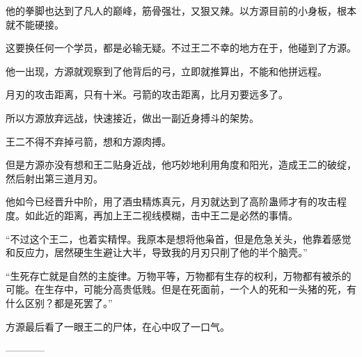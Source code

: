 \begin{this_body}
他的拳脚也达到了凡人的巅峰，筋骨强壮，又狠又辣。以方源目前的小身板，根本就不能硬接。

这要换任何一个学员，都是必输无疑。不过王二不幸的地方在于，他碰到了方源。

他一出现，方源就观察到了他背后的弓，立即就推算出，不能和他拼远程。

月刃的攻击距离，只有十米。弓箭的攻击距离，比月刃要远多了。

所以方源放弃远战，快速接近，做出一副近身搏斗的架势。

王二不得不弃掉弓箭，想和方源肉搏。

但是方源亦没有想和王二贴身近战，他巧妙地利用角度和阳光，造成王二的破绽，然后射出第三道月刃。

他如今已经晋升中阶，用了酒虫精炼真元，月刃就达到了高阶蛊师才有的攻击程度。如此近的距离，再加上王二视线模糊，击中王二是必然的事情。

“不过这个王二，也着实精悍。我原本是想将他枭首，但是危急关头，他靠着感觉和反应力，居然硬生生避让大半，导致我的月刃只削了他的半个脑壳。”

“生死存亡就是自然的主旋律。万物平等，万物都有生存的权利，万物都有被杀的可能。在生存中，可能分高贵低贱。但是在死面前，一个人的死和一头猪的死，有什么区别？都是死罢了。”

方源最后看了一眼王二的尸体，在心中叹了一口气。

------------

\end{this_body}

